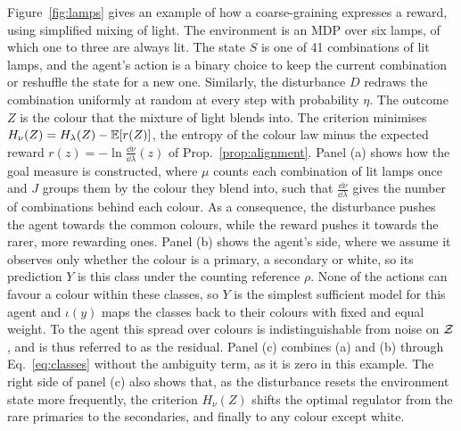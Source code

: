 Figure~\ref{fig:lamps} gives an example of how a coarse-graining expresses a reward, using simplified mixing of light.
The environment is an MDP over six lamps, of which one to three are always lit.
The state $S$ is one of 41 combinations of lit lamps, and the agent's action is a binary choice to keep the current combination or reshuffle the state for a new one.
Similarly, the disturbance $D$ redraws the combination uniformly at random at every step with probability $\eta$.
The outcome $Z$ is the colour that the mixture of light blends into.
The criterion minimises $H_\nu(Z) = H_\lambda(Z) - \mathbb E[r(Z)]$, the entropy of the colour law minus the expected reward $r(z) = -\ln \tfrac{\dd\nu}{\dd\lambda}(z)$ of Prop.~\ref{prop:alignment}.
Panel (a) shows how the goal measure is constructed, where $\mu$ counts each combination of lit lamps once and $J$ groups them by the colour they blend into, such that $\tfrac{\dd\nu}{\dd\lambda}$ gives the number of combinations behind each colour.
As a consequence, the disturbance pushes the agent towards the common colours, while the reward pushes it towards the rarer, more rewarding ones.
Panel (b) shows the agent's side, where we assume it observes only whether the colour is a primary, a secondary or white, so its prediction $Y$ is this class under the counting reference $\rho$.
None of the actions can favour a colour within these classes, so $Y$ is the simplest sufficient model for this agent and $\iota(y)$ maps the classes back to their colours with fixed and equal weight.
To the agent this spread over colours is indistinguishable from noise on $\mathcal Z$, and is thus referred to as the residual.
Panel (c) combines (a) and (b) through Eq.~\eqref{eq:classes} without the ambiguity term, as it is zero in this example.
The right side of panel (c) also shows that, as the disturbance resets the environment state more frequently, the criterion $H_\nu(Z)$ shifts the optimal regulator from the rare primaries to the secondaries, and finally to any colour except white.



